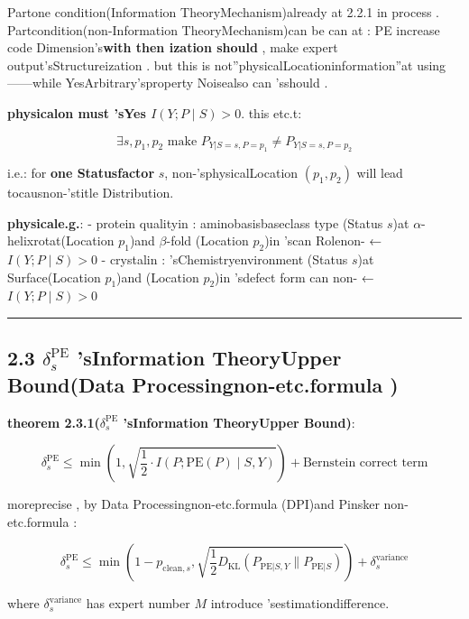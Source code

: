 \documentclass[
  12pt,
]{article}
\begin{document}
Partone condition(Information TheoryMechanism)already at  2.2.1
in process . Partcondition(non-Information TheoryMechanism)can be can at : PE
increase code Dimension's\textbf{with then ization should }, make expert output'sStructureization . but this is not''physicalLocationinformation''at using ------while YesArbitrary'sproperty Noisealso can 'sshould . 

\textbf{physicalon must 'sYes \(I(Y; P \mid S) > 0\)}. this etc.t: 

\[\exists s, p_1, p_2 \text{ make  } P_{Y|S=s, P=p_1} \neq P_{Y|S=s, P=p_2}\]

i.e.: for \textbf{one Statusfactor } \(s\), non-'sphysicalLocation \((p_1, p_2)\)
will lead tocausnon-'stitle Distribution. 

\textbf{physicale.g.}:  - protein qualityin : aminobasisbaseclass type (Status \(s\))at 
\(\alpha\)-helixrotat(Location \(p_1\))and  \(\beta\)-fold (Location
\(p_2\))in 'scan Rolenon- ← \(I(Y; P \mid S) > 0\) -
crystalin : 'sChemistryenvironment (Status \(s\))at Surface(Location \(p_1\))and (Location
\(p_2\))in 'sdefect form can non- ← \(I(Y; P \mid S) > 0\)

\begin{center}\rule{0.5\linewidth}{0.5pt}\end{center}

\subsection{\texorpdfstring{2.3 \(\delta_s^{\text{PE}}\)
'sInformation TheoryUpper Bound(Data Processingnon-etc.formula )}{2.3 \textbackslash delta\_s\^{}\{\textbackslash text\{PE\}\} 'sInformation TheoryUpper Bound(Data Processingnon-etc.formula )}}\label{delta_stextpe-ux7684ux4fe1ux606fux8bbaux4e0aux754cux6570ux636eux5904ux7406ux4e0dux7b49ux5f0f}

\textbf{theorem  2.3.1(\(\delta_s^{\text{PE}}\) 'sInformation TheoryUpper Bound)}: 

\[\boxed{\delta_s^{\text{PE}} \leq \min\left(1, \sqrt{\frac{1}{2} \cdot I(P; \text{PE}(P) \mid S, Y)}\right) + \text{Bernstein correct term}}\]

moreprecise , by Data Processingnon-etc.formula (DPI)and  Pinsker non-etc.formula : 

\[\delta_s^{\text{PE}} \leq \min\left(1 - p_{\text{clean}, s}, \sqrt{\frac{1}{2} D_{\text{KL}}(P_{\text{PE}|S,Y} \| P_{\text{PE}|S})}\right) + \delta_s^{\text{variance}}\]

where \(\delta_s^{\text{variance}}\) has expert number  \(M\)
introduce 'sestimationdifference. 
\end{document}
